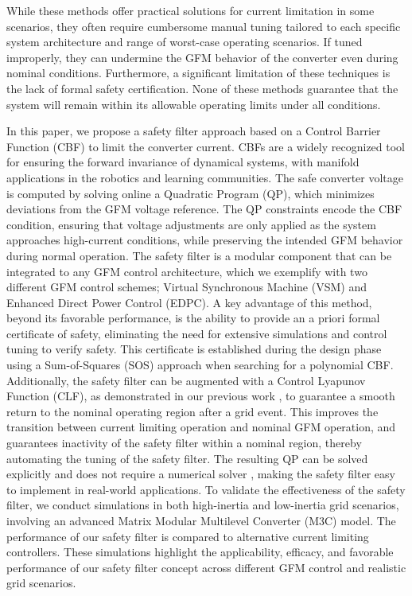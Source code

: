 \documentclass[lettersize,journal]{IEEEtran}
\newcommand{\markAsChanged}[1]{{\color{black}#1}}
\begin{document}
While these methods offer practical solutions for current limitation in some scenarios, they often require cumbersome manual tuning tailored to each specific system architecture and range of worst-case operating scenarios.
If tuned improperly, they can undermine the GFM behavior of the converter even during nominal conditions.
Furthermore, a significant limitation of these techniques is the lack of formal safety certification. 
None of these methods guarantee that the system will remain within its allowable operating limits under all conditions.

In this paper, we propose a safety filter approach based on a Control Barrier Function (CBF) to limit the converter current.
CBFs are a widely recognized tool for ensuring the forward invariance of dynamical systems, with manifold applications in the robotics and learning communities.
The safe converter voltage is computed by solving online a Quadratic Program (QP), which minimizes deviations from the GFM voltage reference.
The QP constraints encode the CBF condition, ensuring that voltage adjustments are only applied as the system approaches high-current conditions, while preserving the intended GFM behavior during normal operation.
The safety filter is a modular component that can be integrated to any GFM control architecture, which we exemplify with two different GFM control schemes; Virtual Synchronous Machine (VSM) and Enhanced Direct Power Control (EDPC).
\markAsChanged{A key advantage of this method, beyond its favorable performance, is the ability to provide an a priori formal certificate of safety, eliminating the need for extensive simulations and control tuning to verify safety.
This certificate is established during the design phase using a Sum-of-Squares (SOS) approach when searching for a polynomial CBF.}
Additionally, the safety filter can be augmented with a Control Lyapunov Function (CLF), as demonstrated in our previous work \cite{schneeberger2024advanced}, to guarantee a smooth return to the nominal operating region after a grid event.
This improves the transition between current limiting operation and nominal GFM operation, and guarantees inactivity of the safety filter within a nominal region, thereby automating the tuning of the safety filter.
The resulting QP can be solved explicitly and does not require a numerical solver \cite{ames2016control}, making the safety filter easy to implement in real-world applications.
To validate the effectiveness of the safety filter, we conduct simulations in both high-inertia and low-inertia grid scenarios, involving an advanced Matrix Modular Multilevel Converter (M3C) model.
The performance of our safety filter is compared to alternative current limiting controllers.
These simulations highlight the applicability, efficacy, and favorable performance of our safety filter concept across different GFM control and realistic grid scenarios.
\end{document}
